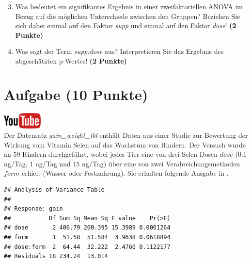 \documentclass[a4paper, 9pt]{scrartcl}\usepackage[]{graphicx}\usepackage[]{xcolor}
\makeatletter
\newenvironment{kframe}{%
 \def\at@end@of@kframe{}%
 \ifinner\ifhmode%
  \def\at@end@of@kframe{\end{minipage}}%
  \begin{minipage}{\columnwidth}%
 \fi\fi%
 \def\FrameCommand##1{\hskip\@totalleftmargin \hskip-\fboxsep
 \colorbox{shadecolor}{##1}\hskip-\fboxsep
     \hskip-\linewidth \hskip-\@totalleftmargin \hskip\columnwidth}%
 \MakeFramed {\advance\hsize-\width
   \@totalleftmargin\z@ \linewidth\hsize
   \@setminipage}}%
 {\par\unskip\endMakeFramed%
 \at@end@of@kframe}
\newenvironment{knitrout}{}{} %
\makeatother
\begin{document}
\vspace{1Ex}

\begin{enumerate}
  \setcounter{enumi}{2}
\item Was bedeutet ein signifikantes Ergebnis in einer zweifaktoriellen
  ANOVA im Bezug auf die m{\"o}glichen Unterschiede zwischen den Gruppen?
  Beziehen Sie sich dabei einmal auf den Faktor \textit{supp} und einmal
  auf den Faktor \textit{dose}! \textbf{(2 Punkte)}
\item Was sagt der Term \textit{supp:dose} aus? Interpretieren Sie das
  Ergebnis des abgesch{\"a}tzten p-Wertes! \textbf{(2 Punkte)}
\end{enumerate}
 
\clearpage

\section{Aufgabe \hfill (10 Punkte)}

\hfill\href{https://youtu.be/rWTyHXXlYjY}{\includegraphics[width =
  2cm]{img/youtube}}\\[1Ex]



Der Datensatz \textit{gain\_weight\_tbl} enth{\"a}lt Daten aus einer Studie zur Bewertung
der Wirkung vom Vitamin Selen auf das Wachstum von Rindern. Der
Versuch wurde an 59 Rindern durchgef{\"u}hrt, wobei
jedes Tier eine von drei Selen-Dosen $dose$ ($0.1$ ng/Tag, $1$ ng/Tag und $15$ ng/Tag)
{\"u}ber eine von zwei Verabreichungsmethoden $form$ erhielt (Wasser oder
Festnahrung). Sie erhalten folgende Ausgabe in \Rlogo.

\begin{knitrout}
\color{fgcolor}\begin{kframe}
\begin{verbatim}
## Analysis of Variance Table
## 
## Response: gain
##           Df Sum Sq Mean Sq F value    Pr(>F)
## dose       2 400.79 200.395 15.3989 0.0001264
## form       1  51.58  51.584  3.9638 0.0618894
## dose:form  2  64.44  32.222  2.4760 0.1122177
## Residuals 18 234.24  13.014
\end{verbatim}
\end{kframe}
\end{knitrout}
\end{document}

